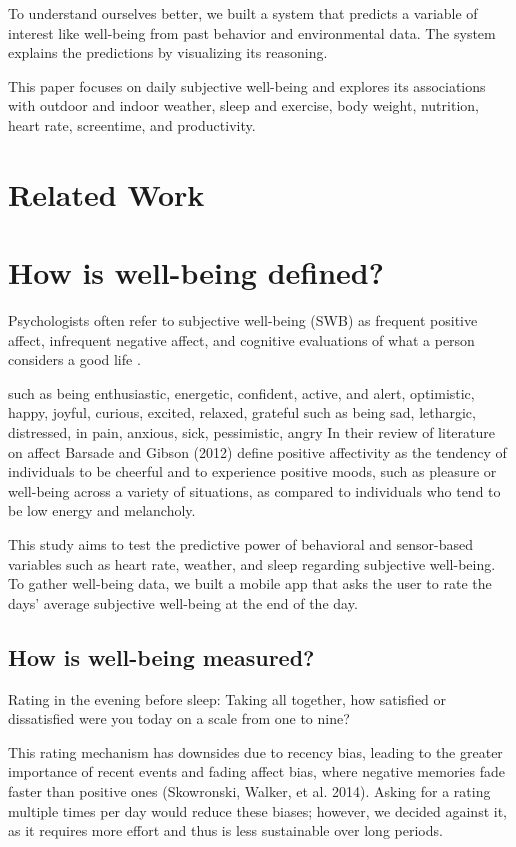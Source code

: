 \documentclass[conference]{IEEEtran}
\begin{document}
To understand ourselves better, we built a system that predicts a variable of interest like well-being from past behavior and environmental data.
The system explains the predictions by visualizing its reasoning. 

This paper focuses on daily subjective well-being and explores its associations with outdoor and indoor weather, sleep and exercise, body weight, nutrition, heart rate, screentime, and productivity.

\section{Related Work}
\section{How is well-being defined?}
Psychologists often refer to subjective well-being (SWB) as frequent positive affect, infrequent negative affect, and cognitive evaluations of what a person considers a good life \cite{tov_subjective_2013}.

such as being enthusiastic, energetic, confident, active, and alert, optimistic, happy, joyful, curious, excited, relaxed, grateful
such as being sad, lethargic, distressed, in pain, anxious, sick, pessimistic, angry
In their review of literature on affect Barsade and Gibson (2012) define positive affectivity as the tendency of individuals to be cheerful and to experience positive moods, such as pleasure or well-being across a variety of situations, as compared to individuals who tend to be low energy and melancholy.

This study aims to test the predictive power of behavioral and sensor-based variables such as heart rate, weather, and sleep regarding subjective well-being.
To gather well-being data, we built a mobile app that asks the user to rate the days' average subjective well-being at the end of the day. 

\subsection{How is well-being measured?}
Rating in the evening before sleep:
Taking all together, how satisfied or dissatisfied were you
today on a scale from one to nine?

This rating mechanism has downsides due to recency bias, leading to the greater importance of recent events and fading affect bias, where negative memories fade faster than positive ones (Skowronski, Walker, et al. 2014).
Asking for a rating multiple times per day would reduce these biases; however, we decided against it, as it requires more effort and thus is less sustainable over long periods. 
\end{document}
